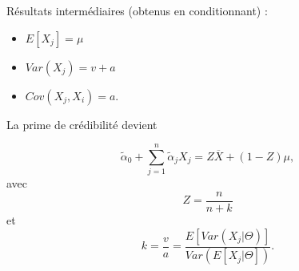 Résultats intermédiaires (obtenus en conditionnant) :

\begin{itemize}
	\item $\displaystyle E[X_j] = \mu$
	\item $\displaystyle Var(X_j) = v + a$
	\item $\displaystyle Cov(X_j, X_i) = a$.
\end{itemize}

La prime de crédibilité devient

$$\tilde{\alpha}_0 + \sum_{j = 1}^{n}\tilde{\alpha}_jX_j = Z\overline{X} + (1-Z)\mu,$$
avec
$$Z = \frac{n}{n + k}$$
et
$$k = \frac{v}{a} = \frac{E[Var(X_j \vert \Theta)]}{Var(E[X_j \vert \Theta])}.$$




















